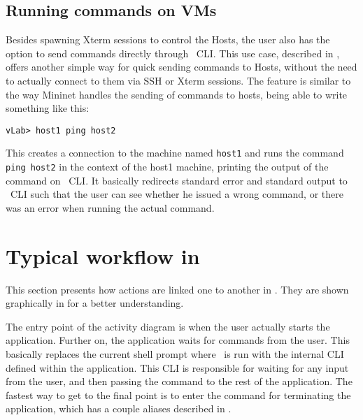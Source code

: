 \subsection{Running commands on VMs}
\label{sub-sec:run-cmd}


Besides spawning Xterm sessions to control the Hosts, the user also has the option to send commands directly through \project\ CLI.
This use case, described in , offers another simple way for quick sending commands to Hosts, without the need to actually connect to them via SSH or Xterm sessions.
The feature is similar to the way Mininet handles the sending of commands to hosts, being able to write something like this:

\lstset{label=lst:ping-example}
\begin{lstlisting}
vLab> host1 ping host2
\end{lstlisting}

This creates a connection to the machine named \texttt{host1} and runs the command \texttt{ping host2} in the context of the host1 machine, printing the output of the command on \project\ CLI.
It basically redirects standard error and standard output to \project\ CLI such that the user can see whether he issued a wrong command, or there was an error when running the actual command.

\section{Typical workflow in \project}
\label{sec:typical-workflow}

This section presents how actions are linked one to another in \project.
They are shown graphically in  for a better understanding.


The entry point of the activity diagram is when the user actually starts the application.
Further on, the application waits for commands from the user.
This basically replaces the current shell prompt where \project\ is run with the internal CLI defined within the application.
This CLI is responsible for waiting for any input from the user, and then passing the command to the rest of the application.
The fastest way to get to the final point is to enter the command for terminating the application, which has a couple aliases described in .


